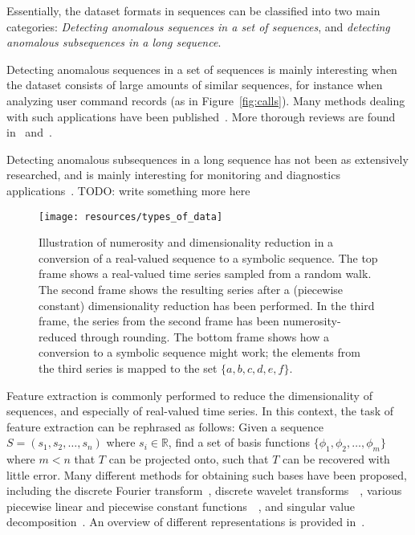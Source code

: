 Essentially, the dataset formats in sequences can be classified into two main categories: \emph{Detecting anomalous sequences in a set of sequences}, and \emph{detecting anomalous subsequences in a long sequence}.

Detecting anomalous sequences in a set of sequences is mainly interesting when the dataset consists of large amounts of similar sequences, for instance when analyzing user command records (as in Figure~\ref{fig:calls}). Many methods dealing with such applications have been published~\cite{blender}\cite{chan}\cite{ye}\cite{forrest}\cite{sekar1}\cite{sekar2}. More thorough reviews are found in~\cite{chandola2} and~\cite{chandola3}.

Detecting anomalous subsequences in a long sequence has not been as extensively researched, and is mainly interesting for monitoring and diagnostics applications~\cite{TODO}. TODO: write something more here 

\begin{figure}[htb]
  \begin{center}
    \leavevmode
    \texttt{[image: resources/types\_of\_data]}
  \end{center}
  \caption{\small{Illustration of numerosity and dimensionality reduction in a conversion of a real-valued sequence to a symbolic sequence. The top frame shows a real-valued time series sampled from a random walk. The second frame shows the resulting series after a (piecewise constant) dimensionality reduction has been performed. In the third frame, the series from the second frame has been numerosity-reduced through rounding. The bottom frame shows how a conversion to a symbolic sequence might work; the elements from the third series is mapped to the set $\{a,b,c,d,e,f\}$.}}
\label{fig:types_of_data}
\end{figure}

Feature extraction is commonly performed to reduce the dimensionality of sequences, and especially of real-valued time series. In this context, the task of feature extraction can be rephrased as follows: Given a sequence $S = ( s_1, s_2, \dots, s_n )$ where $s_i \in \mathbb{R}$, find a set of basis functions $\{ \phi_1, \phi_2, \dots, \phi_m \}$ where $m < n$ that $T$ can be projected onto, such that $T$ can be recovered with little error. Many different methods for obtaining such bases have been proposed, including the discrete Fourier transform~\cite{faloutsos1}, discrete wavelet transforms~\cite{pong}~\cite{fu}, various piecewise linear and piecewise constant functions~\cite{keogh3}~\cite{geurts}, and singular value decomposition~\cite{keogh3}. An overview of different representations is provided in~\cite{fabian}.

